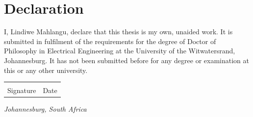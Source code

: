 \chapter*{Declaration}

I, Lindiwe Mahlangu, declare that this thesis is my own, unaided work. It is submitted in
fulfilment of the requirements for the degree of Doctor of Philosophy in Electrical
Engineering at the University of the Witwatersrand, Johannesburg. It has not been submitted
before for any degree or examination at this or any other university.

\vspace{1.6cm}
\begin{tabular}{@{}p{4.5cm}p{4.5cm}}
\dotfill & \dotfill \\
Signature & Date
\end{tabular}

\vspace{1cm}
\noindent\textit{Johannesburg, South Africa}


